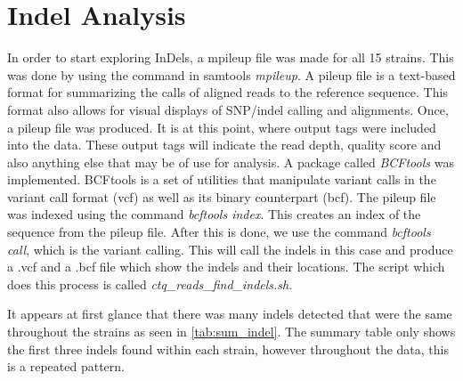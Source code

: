 \documentclass[12pt]{article}
\begin{document}
\section{Indel Analysis}
\vspace{-0.5cm}
In order to start exploring InDels, a mpileup file was made for all 15 strains. This was done by using the command in samtools \textit{mpileup}. A pileup file is a text-based format for summarizing the calls of aligned reads to the reference sequence. This format also allows for visual displays of SNP/indel calling and alignments. Once, a pileup file was produced. It is at this point, where output tags were included into the data. These output tags will indicate the read depth, quality score and also anything else that may be of use for analysis.  A package called \textit{BCFtools} was implemented. BCFtools is a set of utilities that manipulate variant calls in the variant call format (vcf) as well as its binary counterpart (bcf). The pileup file was indexed using the command \textit{bcftools index}. This creates an index of the sequence from the pileup file. After this is done, we use the command \textit{bcftools call}, which is the variant calling. This will call the indels in this case and produce a .vcf and a .bcf file which show the indels and their locations. The script which does this process is called \textit{ctq\_reads\_find\_indels.sh}. 

It appears at first glance that there was many indels detected that were the same throughout the strains as seen in \ref{tab:sum_indel}. The summary table only shows the first three indels found within each strain, however throughout the data, this is a repeated pattern. 
\end{document}
